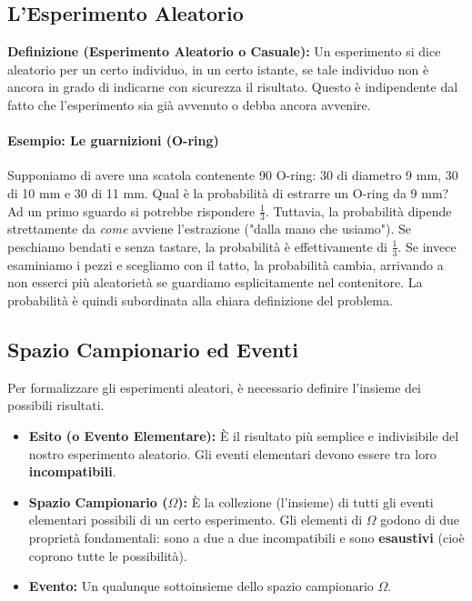 \documentclass[12pt, a4paper]{article}
\begin{document}
\subsection{L'Esperimento Aleatorio}
\textbf{Definizione (Esperimento Aleatorio o Casuale):} Un esperimento si dice aleatorio per un certo individuo, in un certo istante, se tale individuo non è ancora in grado di indicarne con sicurezza il risultato. Questo è indipendente dal fatto che l'esperimento sia già avvenuto o debba ancora avvenire.

\paragraph{Esempio: Le guarnizioni (O-ring)}
Supponiamo di avere una scatola contenente 90 O-ring: 30 di diametro 9 mm, 30 di 10 mm e 30 di 11 mm. Qual è la probabilità di estrarre un O-ring da 9 mm? 
Ad un primo sguardo si potrebbe rispondere $\frac{1}{3}$. Tuttavia, la probabilità dipende strettamente da \textit{come} avviene l'estrazione ("dalla mano che usiamo"). Se peschiamo bendati e senza tastare, la probabilità è effettivamente di $\frac{1}{3}$. Se invece esaminiamo i pezzi e scegliamo con il tatto, la probabilità cambia, arrivando a non esserci più aleatorietà se guardiamo esplicitamente nel contenitore. 
La probabilità è quindi subordinata alla chiara definizione del problema.

\subsection{Spazio Campionario ed Eventi}
Per formalizzare gli esperimenti aleatori, è necessario definire l'insieme dei possibili risultati.

\begin{itemize}
    \item \textbf{Esito (o Evento Elementare):} È il risultato più semplice e indivisibile del nostro esperimento aleatorio. Gli eventi elementari devono essere tra loro \textbf{incompatibili}.
    \item \textbf{Spazio Campionario ($\Omega$):} È la collezione (l'insieme) di tutti gli eventi elementari possibili di un certo esperimento. Gli elementi di $\Omega$ godono di due proprietà fondamentali: sono a due a due incompatibili e sono \textbf{esaustivi} (cioè coprono tutte le possibilità).
    \item \textbf{Evento:} Un qualunque sottoinsieme dello spazio campionario $\Omega$.
\end{itemize}
\end{document}
